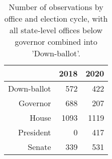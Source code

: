 \begin{table}[ht]
\centering
\begin{tabular}{rrr}
  \hline
 & 2018 & 2020 \\ 
  \hline
Down-ballot & 572 & 422 \\ 
  Governor & 688 & 207 \\ 
  House & 1093 & 1119 \\ 
  President &   0 & 417 \\ 
  Senate & 339 & 531 \\ 
   \hline
\end{tabular}
\caption{Number of observations by office and election cycle, with all state-level offices below governor combined into 'Down-ballot'.} 
\label{office_by_year}
\end{table}
